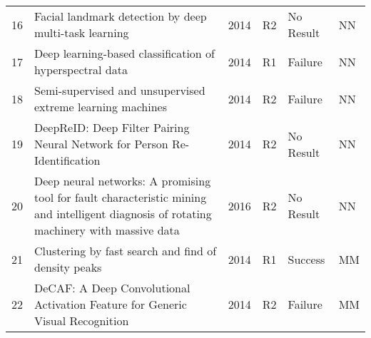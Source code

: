 \begin{tabularx}{\textwidth}{lXllll}
 16 &  Facial landmark detection by deep multi-task learning &  2014 &  R2 &  No Result &  NN \\
 17 &  Deep learning-based classification of hyperspectral data &  2014 &  R1 &  Failure &  NN \\
 18 &  Semi-supervised and unsupervised extreme learning machines &  2014 &  R2 &  Failure &  NN \\
 19 &  DeepReID: Deep Filter Pairing Neural Network for Person Re-Identification &  2014 &  R2 &  No Result &  NN \\
 20 &  Deep neural networks: A promising tool for fault characteristic mining and intelligent diagnosis of rotating machinery with massive data &  2016 &  R2 &  No Result &  NN \\
 21 &  Clustering by fast search and find of density peaks &  2014 &  R1 &  Success &  MM \\
 22 &  DeCAF: A Deep Convolutional Activation Feature for Generic Visual Recognition &  2014 &  R2 &  Failure &  MM \\
\bottomrule
\end{tabularx}
